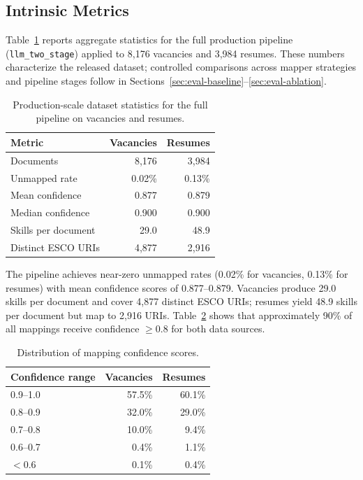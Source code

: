 \documentclass[11pt]{article}
\begin{document}
\subsection{Intrinsic Metrics}
\label{sec:eval-intrinsic}

Table~\ref{tab:intrinsic} reports aggregate statistics for the full production pipeline (\texttt{llm\_two\_stage}) applied to 8,176 vacancies and 3,984 resumes. These numbers characterize the released dataset; controlled comparisons across mapper strategies and pipeline stages follow in Sections~\ref{sec:eval-baseline}--\ref{sec:eval-ablation}.

\begin{table}[h]
  \centering
  \small
  \begin{tabular}{@{}lrr@{}}
    \toprule
    \textbf{Metric} & \textbf{Vacancies} & \textbf{Resumes} \\
    \midrule
    Documents & 8{,}176 & 3{,}984 \\
    Unmapped rate & 0.02\% & 0.13\% \\
    Mean confidence & 0.877 & 0.879 \\
    Median confidence & 0.900 & 0.900 \\
    Skills per document & 29.0 & 48.9 \\
    Distinct ESCO URIs & 4{,}877 & 2{,}916 \\
    \bottomrule
  \end{tabular}
  \caption{Production-scale dataset statistics for the full pipeline on vacancies and resumes.}
  \label{tab:intrinsic}
\end{table}

The pipeline achieves near-zero unmapped rates (0.02\% for vacancies, 0.13\% for resumes) with mean confidence scores of 0.877--0.879. Vacancies produce 29.0 skills per document and cover 4{,}877 distinct ESCO URIs; resumes yield 48.9 skills per document but map to 2{,}916 URIs. Table~\ref{tab:confidence} shows that approximately 90\% of all mappings receive confidence $\geq 0.8$ for both data sources.

\begin{table}[h]
  \centering
  \small
  \begin{tabular}{@{}lrr@{}}
    \toprule
    \textbf{Confidence range} & \textbf{Vacancies} & \textbf{Resumes} \\
    \midrule
    0.9--1.0 & 57.5\% & 60.1\% \\
    0.8--0.9 & 32.0\% & 29.0\% \\
    0.7--0.8 & 10.0\% & 9.4\% \\
    0.6--0.7 & 0.4\% & 1.1\% \\
    $<$0.6 & 0.1\% & 0.4\% \\
    \bottomrule
  \end{tabular}
  \caption{Distribution of mapping confidence scores.}
  \label{tab:confidence}
\end{table}
\end{document}
